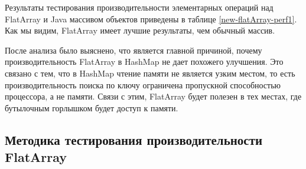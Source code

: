 Результаты тестирования производительности элементарных операций над FlatArray и Java массивом объектов приведены в таблице \ref{new-flatArray-perf1}. Как мы видим, FlatArray имеет лучшие результаты, чем обычный массив.
\par
После анализа было выяснено, что является главной причиной, почему производительность FlatArray в HashMap не дает похожего улучшения. Это связано с тем, что в HashMap чтение памяти не является узким местом, то есть производительность поиска по ключу ограничена пропускной способностью процессора, а не памяти. Связи с этим, FlatArray будет полезен в тех местах, где бутылочным горлышком будет доступ к памяти.

\subsection{Методика тестирования производительности FlatArray} \label{benchmarks}
